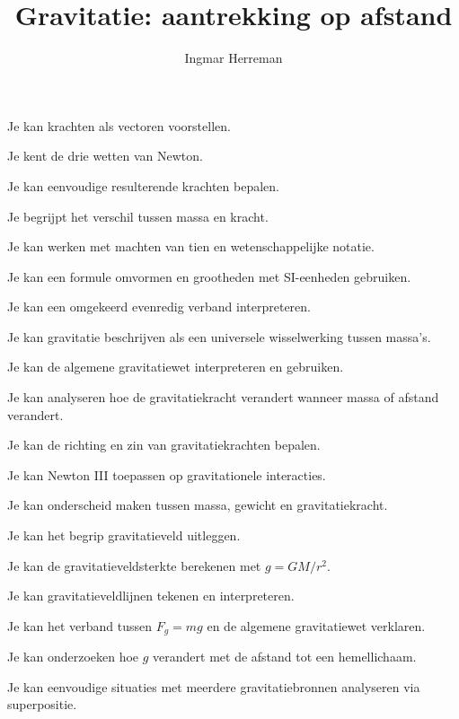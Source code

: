 \documentclass{ximera}
\title{Gravitatie: aantrekking op afstand}
\author{Ingmar Herreman}
\begin{document}











\maketitle



\begin{voorkennis}
  \item Je kan krachten als vectoren voorstellen.
  \item Je kent de drie wetten van Newton.
  \item Je kan eenvoudige resulterende krachten bepalen.
  \item Je begrijpt het verschil tussen massa en kracht.
  \item Je kan werken met machten van tien en wetenschappelijke notatie.
  \item Je kan een formule omvormen en grootheden met SI-eenheden gebruiken.
  \item Je kan een omgekeerd evenredig verband interpreteren.
\end{voorkennis}

\begin{leerdoelen}
  \item Je kan gravitatie beschrijven als een universele wisselwerking
        tussen massa's.
  \item Je kan de algemene gravitatiewet interpreteren en gebruiken.
  \item Je kan analyseren hoe de gravitatiekracht verandert wanneer
        massa of afstand verandert.
  \item Je kan de richting en zin van gravitatiekrachten bepalen.
  \item Je kan Newton III toepassen op gravitationele interacties.
  \item Je kan onderscheid maken tussen massa, gewicht en gravitatiekracht.
  \item Je kan het begrip gravitatieveld uitleggen.
  \item Je kan de gravitatieveldsterkte berekenen met
        $g=GM/r^2$.
  \item Je kan gravitatieveldlijnen tekenen en interpreteren.
  \item Je kan het verband tussen $F_g=mg$ en de algemene gravitatiewet
        verklaren.
  \item Je kan onderzoeken hoe $g$ verandert met de afstand tot een
        hemellichaam.
  \item Je kan eenvoudige situaties met meerdere gravitatiebronnen
        analyseren via superpositie.
\end{leerdoelen}
\end{document}
